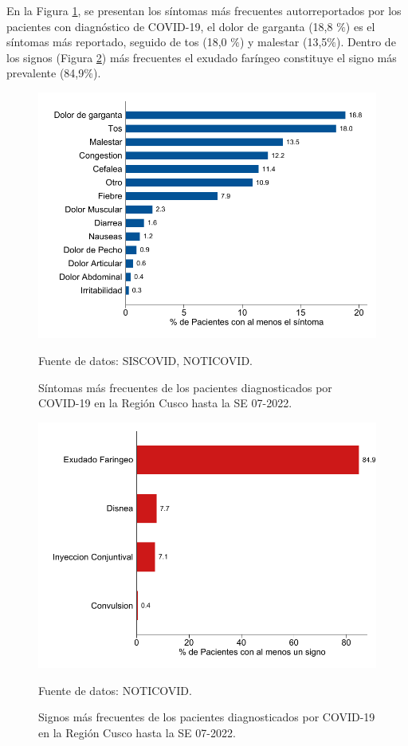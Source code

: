 \documentclass[12pt,a4paper,openany]{book}
\begin{document}
\noindent En la Figura \ref{fig:sintomas}, se presentan los síntomas más frecuentes autorreportados por los pacientes con diagnóstico de COVID-19, el dolor de garganta (18,8 $\%$) es el síntomas más reportado, seguido de tos (18,0 $\%$) y malestar (13,5$\%$). Dentro de los signos (Figura \ref{fig:signos}) más frecuentes el exudado faríngeo constituye el signo más prevalente (84,9$\%$). 

\begin{figure}[h]
	\caption{Síntomas más frecuentes de los pacientes diagnosticados por COVID-19 en la Región Cusco hasta la SE 07-2022.  }\label{fig:sintomas}
	\begin{center}
		\includegraphics[width=0.85\linewidth]{../figuras/figura_sintoma.pdf}
	\end{center}
	{\footnotesize {Fuente de datos: SISCOVID, NOTICOVID.}}
\end{figure}

\begin{figure}[h]
	\caption{Signos más frecuentes de los pacientes diagnosticados por COVID-19 en la Región Cusco hasta la SE 07-2022.}\label{fig:signos}
	\begin{center}
		\includegraphics[width=0.65\linewidth]{../figuras/figura_signo.pdf}
	\end{center}
	{\footnotesize {Fuente de datos: NOTICOVID.}}
\end{figure}
\end{document}
